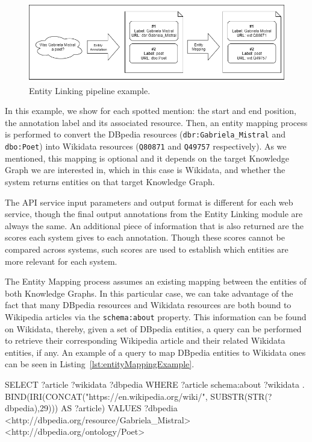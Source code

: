 \begin{figure}[!h]
    \centering
    \includegraphics[scale=.5]{imagenes/3_system_overview/individualEntityLinkingPipeline.png}
    \caption{Entity Linking pipeline example.}
    \label{fig:entityLinkingPipeline}
\end{figure}

In this example, we show for each spotted mention: the start and end position, the annotation 
label and its associated resource. Then, an entity mapping process is performed to convert 
the DBpedia resources (\texttt{dbr:Gabriela\_Mistral} and \texttt{dbo:Poet}) into Wikidata 
resources (\texttt{Q80871} and \texttt{Q49757} respectively). As we mentioned, this 
mapping is optional and it depends on the target Knowledge Graph we are interested in, which 
in this case is Wikidata, and whether the system returns entities on that target Knowledge 
Graph.

The API service input parameters and output format is different for each web service, though 
the final output annotations from the Entity Linking module are always the same. An additional 
piece of information that is also returned are the scores each system gives to each annotation. 
Though these scores cannot be compared across systems, such scores are used to establish 
which entities are more relevant for each system. 

The Entity Mapping process assumes an existing mapping between the entities of both Knowledge 
Graphs. In this particular case, we can take advantage of the fact that many DBpedia resources 
and Wikidata resources are both bound to Wikipedia articles via the \texttt{schema:about} property. 
This information can be found on Wikidata, thereby, given a set of DBpedia entities, a \SPARQL{} 
query can be performed to retrieve their corresponding Wikipedia article and their related 
Wikidata entities, if any. An example of a \SPARQL{} query to map DBpedia entities to Wikidata 
ones can be seen in Listing~\ref{lst:entityMappingExample}.

\begin{sparqlcode}[%
    caption={\SPARQL{} query example to map DBpedia resources to Wikidata ones.}, 
    label={lst:entityMappingExample}]
SELECT ?article ?wikidata ?dbpedia WHERE {
    ?article schema:about ?wikidata .
    BIND(IRI(CONCAT("https://en.wikipedia.org/wiki/", SUBSTR(STR(?dbpedia),29))) AS ?article)
    VALUES ?dbpedia { <http://dbpedia.org/resource/Gabriela_Mistral> <http://dbpedia.org/ontology/Poet> }
}
\end{sparqlcode}


